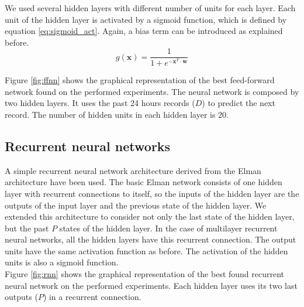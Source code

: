 \documentclass[10pt,a4paper]{article}
\begin{document}
We used several hidden layers with different number of units for each layer. Each unit of the hidden layer is activated by a sigmoid function, which is defined by equation \ref{eq:sigmoid_act}. Again, a bias term can be introduced as explained before.\\

\begin{equation}\label{eq:sigmoid_act}
g(\mathbf{x}) = \frac{1}{1 + e^{-\mathbf{x}^T \cdot \mathbf{w}}}
\end{equation}

Figure \ref{fig:ffnn} shows the graphical representation of the best feed-forward network found on the performed experiments. The neural network is composed by two hidden layers. It uses the past 24 hours records ($D$) to predict the next record. The number of hidden units in each hidden layer is 20.\\

\subsection{Recurrent neural networks}
A simple recurrent neural network architecture derived from the Elman architecture have been used. The basic Elman network consists of one hidden layer with recurrent connections to itself, so the inputs of the hidden layer are the outputs of the input layer and the previous state of the hidden layer. We extended this architecture to consider not only the last state of the hidden layer, but the past $P$ states of the hidden layer. In the case of multilayer recurrent neural networks, all the hidden layers have this recurrent connection. The output units have the same activation function as before. The activation of the hidden units is also a sigmoid function.\\


Figure \ref{fig:rnn} shows the graphical representation of the best found recurrent neural network on the performed experiments. Each hidden layer uses its two last outputs ($P$) in a recurrent connection.
\end{document}

